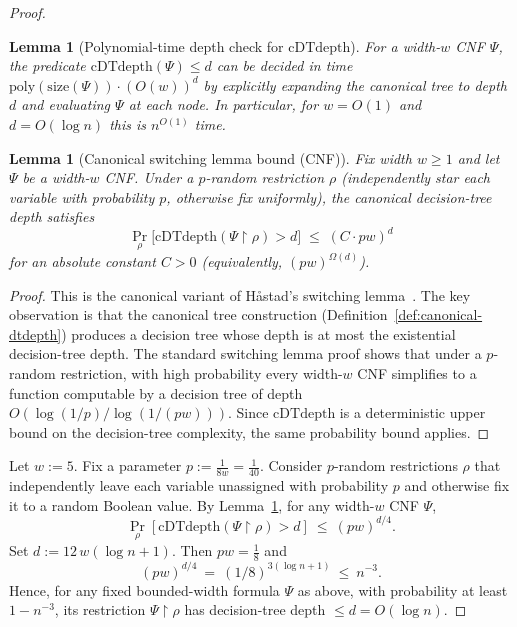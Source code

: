 \documentclass[12pt]{article}
\newtheorem{lemma}[theorem]{Lemma}
\theoremstyle{definition}
\theoremstyle{definition}
\theoremstyle{remark}
\theoremstyle{remark}
\begin{document}
\begin{proof}
\begin{lemma}[Polynomial-time depth check for $\mathrm{cDTdepth}$]
\label{lem:cdtdepth-check-poly}
For a width-$w$ CNF $\Psi$, the predicate $\mathrm{cDTdepth}(\Psi)\le d$ can be decided
in time $\mathrm{poly}(\mathrm{size}(\Psi))\cdot (O(w))^{d}$ by explicitly expanding the canonical tree
to depth $d$ and evaluating $\Psi$ at each node.
In particular, for $w=O(1)$ and $d=O(\log n)$ this is $n^{O(1)}$ time.
\end{lemma}

\begin{lemma}[Canonical switching lemma bound (CNF)]
\label{lem:canonical-switching}
Fix width $w\ge 1$ and let $\Psi$ be a width-$w$ CNF. Under a $p$-random restriction $\rho$
(independently star each variable with probability $p$, otherwise fix uniformly),
the \emph{canonical} decision-tree depth satisfies
\[
\Pr_{\rho}\bigl[\mathrm{cDTdepth}(\Psi\!\upharpoonright\!\rho) > d\bigr]\;\le\; (C\cdot p w)^{d}
\]
for an absolute constant $C>0$ (equivalently, $(pw)^{\Omega(d)}$).
\end{lemma}

\begin{proof}
This is the canonical variant of Håstad's switching lemma~\cite{hastad1987}.
The key observation is that the canonical tree construction (Definition~\ref{def:canonical-dtdepth})
produces a decision tree whose depth is at most the existential decision-tree depth.
The standard switching lemma proof shows that under a $p$-random restriction,
with high probability every width-$w$ CNF simplifies to a function computable by a
decision tree of depth $O(\log(1/p)/\log(1/(pw)))$. Since $\mathrm{cDTdepth}$ is a
deterministic upper bound on the decision-tree complexity, the same probability
bound applies.
\end{proof}

Let $w:=5$. Fix a parameter $p:=\frac{1}{8w}=\frac{1}{40}$. Consider $p$-random restrictions $\rho$ that independently leave each variable unassigned with probability $p$ and otherwise fix it to a random Boolean value. By Lemma~\ref{lem:canonical-switching}, for any width-$w$ CNF $\Psi$,
\[
\Pr_\rho[\mathrm{cDTdepth}(\Psi\upharpoonright\rho)>d]\ \le\ (pw)^{d/4}.
\]
Set $d:=12\,w(\log n+1)$. Then $pw=\frac{1}{8}$ and
\[
(pw)^{d/4}\ =\ (1/8)^{3(\log n+1)}\ \le\ n^{-3}.
\]
Hence, for any fixed bounded-width formula $\Psi$ as above, with probability at least $1-n^{-3}$, its restriction $\Psi\upharpoonright\rho$ has decision-tree depth $\le d=O(\log n)$.


\end{proof}
\end{document}
